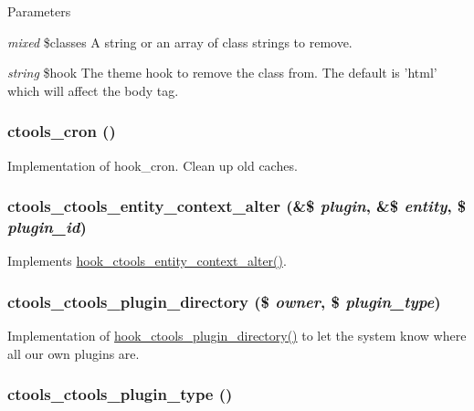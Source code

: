 \begin{DoxyParams}{Parameters}
\item[{\em mixed}]\$classes A string or an array of class strings to remove. \item[{\em string}]\$hook The theme hook to remove the class from. The default is 'html' which will affect the body tag. \end{DoxyParams}
\hypertarget{ctools_8module_a6004ee8fa215743c49e011b33edbe843}{
\subsubsection[{ctools\_\-cron}]{\setlength{\rightskip}{0pt plus 5cm}ctools\_\-cron ()}}
\label{ctools_8module_a6004ee8fa215743c49e011b33edbe843}
Implementation of hook\_\-cron. Clean up old caches. \hypertarget{ctools_8module_aa0eddd96e485a58f4259351b9f9cb918}{
\subsubsection[{ctools\_\-ctools\_\-entity\_\-context\_\-alter}]{\setlength{\rightskip}{0pt plus 5cm}ctools\_\-ctools\_\-entity\_\-context\_\-alter (\&\$ {\em plugin}, \/  \&\$ {\em entity}, \/  \$ {\em plugin\_\-id})}}
\label{ctools_8module_aa0eddd96e485a58f4259351b9f9cb918}
Implements \hyperlink{group__hooks_gad8e0232b98d84d2347a3cc1e26c3df09}{hook\_\-ctools\_\-entity\_\-context\_\-alter()}. \hypertarget{ctools_8module_a2b2ccbc9a1ae532cdf17e7d1836a40fb}{
\subsubsection[{ctools\_\-ctools\_\-plugin\_\-directory}]{\setlength{\rightskip}{0pt plus 5cm}ctools\_\-ctools\_\-plugin\_\-directory (\$ {\em owner}, \/  \$ {\em plugin\_\-type})}}
\label{ctools_8module_a2b2ccbc9a1ae532cdf17e7d1836a40fb}
Implementation of \hyperlink{group__hooks_gaf17a0de7a7ca6e6c30c766ea1e44715e}{hook\_\-ctools\_\-plugin\_\-directory()} to let the system know where all our own plugins are. \hypertarget{ctools_8module_a76a9ad5ac309f0526af308e38aa3f574}{
\subsubsection[{ctools\_\-ctools\_\-plugin\_\-type}]{\setlength{\rightskip}{0pt plus 5cm}ctools\_\-ctools\_\-plugin\_\-type ()}}
